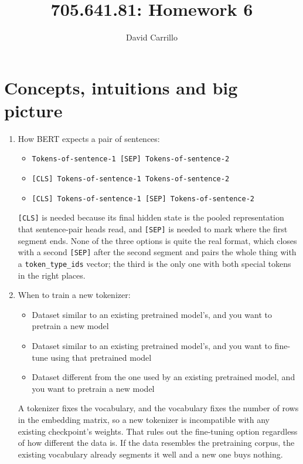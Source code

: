 \documentclass[11pt]{article}
\title{705.641.81: Homework 6}
\author{David Carrillo}
\date{}
\begin{document}
\maketitle

\section{Concepts, intuitions and big picture}

\begin{enumerate}
  \item How BERT expects a pair of sentences:
        \begin{itemize}
          \item[{[\ ]}] \texttt{Tokens-of-sentence-1 [SEP] Tokens-of-sentence-2}
          \item[{[\ ]}] \texttt{[CLS] Tokens-of-sentence-1 Tokens-of-sentence-2}
          \item[{[X]}] \texttt{[CLS] Tokens-of-sentence-1 [SEP] Tokens-of-sentence-2}
        \end{itemize}
        \texttt{[CLS]} is needed because its final hidden state is the pooled representation that sentence-pair
        heads read, and \texttt{[SEP]} is needed to mark where the first segment ends. None of the three options
        is quite the real format, which closes with a second \texttt{[SEP]} after the second segment and pairs
        the whole thing with a \texttt{token\_type\_ids} vector; the third is the only one with both special
        tokens in the right places.

  \item When to train a new tokenizer:
        \begin{itemize}
          \item[{[\ ]}] Dataset similar to an existing pretrained model's, and you want to pretrain a new model
          \item[{[\ ]}] Dataset similar to an existing pretrained model's, and you want to fine-tune using that
                pretrained model
          \item[{[X]}] Dataset different from the one used by an existing pretrained model, and you want to
                pretrain a new model
        \end{itemize}
        A tokenizer fixes the vocabulary, and the vocabulary fixes the number of rows in the embedding matrix,
        so a new tokenizer is incompatible with any existing checkpoint's weights. That rules out the
        fine-tuning option regardless of how different the data is. If the data resembles the pretraining
        corpus, the existing vocabulary already segments it well and a new one buys nothing.


\end{enumerate}
\end{document}
